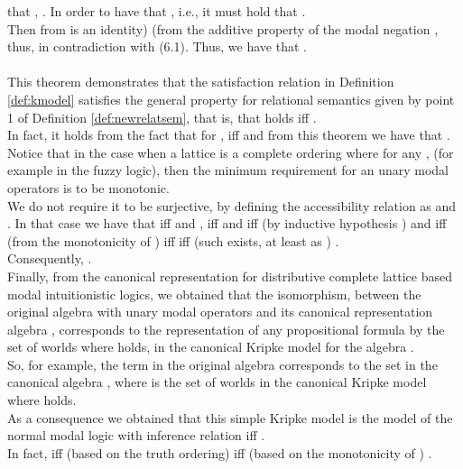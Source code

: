 \documentclass[10pt,twocolumn]{article}
\begin{document}
 that , . In order to have that , i.e.,  it must hold that . \\Then from  is an identity)  (from the additive
 property of the modal negation , thus,  in contradiction with (6.1).
 Thus, we have that .
\\ \\
 This theorem demonstrates that the satisfaction relation in
Definition \ref{def:kmodel} satisfies the general property for
relational semantics given by point 1 of Definition
\ref{def:newrelatsem}, that is, that holds  iff  .\\ In fact, it
holds from the fact that for , 
iff  and  from this theorem we have that .\\
 Notice
that in the case when a lattice  is a complete ordering where for
any ,  (for example in the
fuzzy logic), then the minimum requirement for an unary modal
operators  is to be monotonic.\\ We do not require it to be
surjective, by defining the accessibility relation as  and . In that case we have that  iff  and
, iff  and  iff (by inductive hypothesis )  and
   iff (from the
monotonicity of )  iff  iff (such  exists, at least
as ) .\\ Consequently,
.\\
 Finally, from the canonical representation for distributive complete lattice based modal intuitionistic logics, we obtained that the
isomorphism, between the original  algebra  with unary
modal operators and its canonical representation algebra
, corresponds to the representation of  any
propositional formula  by the set of worlds  where
 holds, in the canonical Kripke
model for the algebra .\\
 So, for example, the term  in the original algebra  corresponds to the
set  in the canonical algebra
, where  is the set of worlds in
the canonical Kripke model    where  holds.\\
As a consequence we obtained that this simple Kripke model is the
model of the normal modal logic with inference relation  iff .\\ In fact,  iff (based on the truth ordering)  iff (based on the monotonicity of
) .\\
\end{document}
